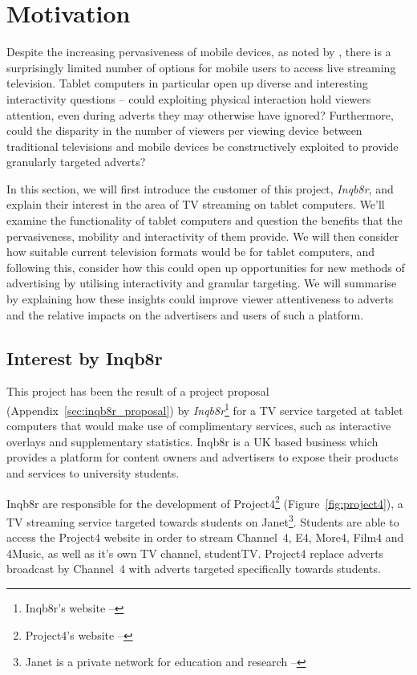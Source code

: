 \section{Motivation}

Despite the increasing pervasiveness of mobile devices, as noted by \citet{socialTV}, there is a surprisingly limited number of options for mobile users to access live streaming television. Tablet computers in particular open up diverse and interesting interactivity questions -- could exploiting physical interaction hold viewers attention, even during adverts they may otherwise have ignored? Furthermore, could the disparity in the number of viewers per viewing device between traditional televisions and mobile devices be constructively exploited to provide granularly targeted adverts?

In this section, we will first introduce the customer of this project, \textit{Inqb8r}, and explain their interest in the area of TV streaming on tablet computers. We'll examine the functionality of tablet computers and question the benefits that the pervasiveness, mobility and interactivity of them provide. We will then consider how suitable current television formats would be for tablet computers, and following this, consider how this could open up opportunities for new methods of advertising by utilising interactivity and granular targeting. We will summarise by explaining how these insights could improve viewer attentiveness to adverts and the relative impacts on the advertisers and users of such a platform.

\subsection{Interest by Inqb8r}
	\label{sec:motivation_inqb8r}
	
	This project has been the result of a project proposal (Appendix~\ref{sec:inqb8r_proposal}) by \textit{Inqb8r}\footnote{Inqb8r's website -- } for a TV service targeted at tablet computers that would make use of complimentary services, such as interactive overlays and supplementary statistics. Inqb8r is a UK based business which provides a platform for content owners and advertisers to expose their products and services to university students.

	Inqb8r are responsible for the development of Project4\footnote{Project4's website -- } (Figure~\ref{fig:project4}), a TV streaming service targeted towards students on Janet\footnote{Janet is a private network for education and research -- }. Students are able to access the Project4 website in order to stream Channel~4, E4, More4, Film4 and 4Music, as well as it's own TV channel, studentTV. Project4 replace adverts broadcast by Channel~4 with adverts targeted specifically towards students.
	
